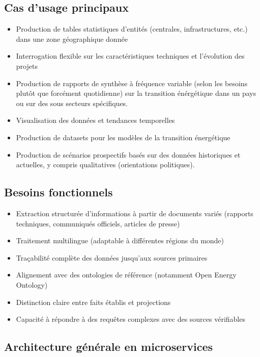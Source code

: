 \documentclass[a4paper,11pt]{report}
\providecommand{\tightlist}{\setlength{\itemsep}{0pt}\setlength{\parskip}{0pt}}
\begin{document}
\subsection{Cas d'usage principaux}\label{cas-dusage-principaux}

\begin{itemize}
\tightlist
\item
  Production de tables statistiques d'entités (centrales, infrastructures, etc.) dans une zone géographique donnée
\item
  Interrogation flexible sur les caractéristiques techniques et l'évolution des projets
\item
  Production de rapports de synthèse à fréquence variable (selon les besoins plutôt que forcément quotidienne) sur la transition énérgétique dans un pays ou sur des sous secteurs spécifiques.
\item
  Visualisation des données et tendances temporelles
\item
  Production de datasets pour les modèles de la transition énergétique
\item
  Production de scénarios prospectifs basés sur des données historiques et actuelles, y compris qualitatives (orientations politiques).
\end{itemize}

\subsection{Besoins fonctionnels}\label{besoins-fonctionnels}

\begin{itemize}
\tightlist
\item
  Extraction structurée d'informations à partir de documents variés (rapports techniques, communiqués officiels, articles de presse)
\item
  Traitement multilingue (adaptable à différentes régions du monde)
\item
  Traçabilité complète des données jusqu'aux sources primaires
\item
  Alignement avec des ontologies de référence (notamment Open Energy Ontology)
\item
  Distinction claire entre faits établis et projections
\item
  Capacité à répondre à des requêtes complexes avec des sources vérifiables
\end{itemize}

\subsection{Architecture générale en microservices}\label{architecture-guxe9nuxe9rale-en-microservices}
\end{document}
